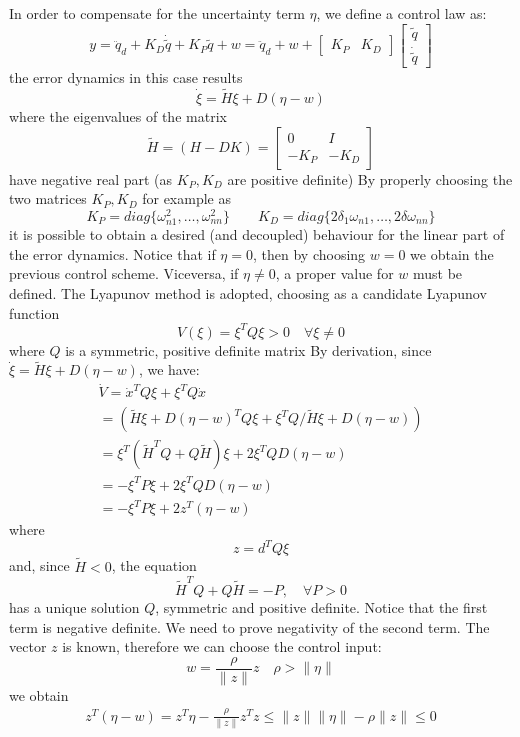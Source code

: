 \documentclass{book}
\begin{document}
In order to compensate for the uncertainty term $\eta$, we define a control law as:
\[
    y = \ddot{q}_d +K_D\dot{\tilde{q}} + K_P\tilde{q}+w = \ddot{q}_d + w + \begin{bmatrix}
        K_P & K_D
    \end{bmatrix} \begin{bmatrix}
    \tilde{q} \\ \dot{\tilde{q}}
    \end{bmatrix}
\]
the error dynamics in this case results
\[
    \dot{\xi} = \tilde{H} \xi + D(\eta-w)
\]
where the eigenvalues of the matrix
\[
    \tilde{H}= (H-DK) = \begin{bmatrix}
        0 & I \\ -K_P & -K_D
    \end{bmatrix}
\]
have negative real part (as $K_P,K_D$ are positive definite)
By properly choosing the two matrices $K_P,K_D$ for example as 
\[
    K_P = diag\{\omega_{n1}^2,\dots,\omega_{nn}^2\} \qquad K_D = diag\{2\delta_1\omega_{n1},\dots,2\delta\omega_{nn}\} 
\]
it is possible to obtain a desired (and decoupled) behaviour for the linear part of the error dynamics. Notice that if $\eta=0$, then by choosing $w=0$ we obtain the previous control scheme. Viceversa, if $\eta\neq 0$, a proper value for $w$ must be defined. The Lyapunov method is adopted, choosing as a candidate Lyapunov function
\[
    V(\xi)=\xi^TQ\xi>0 \quad \forall \xi \neq 0
\]
where $Q$ is a symmetric, positive definite matrix
By derivation, since $\dot{\xi}=\tilde{H}\xi+D(\eta-w)$, we have:
\begin{gather*}
    \dot{V} = \dot{x}^TQ\xi+\xi^TQ\dot{x}\\
    =(\tilde{H}\xi+D(\eta-w)^TQ\xi+\xi^TQ/\tilde{H}\xi+D(\eta-w))\\
    =\xi^T(\tilde{H}^TQ+Q\tilde{H})\xi+2\xi^TQD(\eta-w)\\
    =-\xi^TP\xi+2\xi^TQD(\eta-w)\\
    =-\xi^TP\xi+2z^T(\eta-w)
\end{gather*}
where\[
    z=d^TQ\xi
\]
and, since $\tilde{H}<0$, the equation 
\[
    \tilde{H}^TQ+Q\tilde{H}=-P, \quad \forall P>0
\]
has a unique solution $Q$, symmetric and positive definite. 
Notice that the first term is negative definite. We need to prove negativity of the second term. The vector $z$ is known, therefore we can choose the control input:
\[
    w=\displaystyle\frac{\rho}{\|z\|}z \quad \rho>\|\eta\|
\]
we obtain
\begin{gather*}
    z^T(\eta-w)=z^T\eta-\displaystyle\frac{\rho}{\|z\|}z^Tz \leq \|z\|\|\eta\|-\rho\|z\| \leq 0
\end{gather*}
\end{document}
